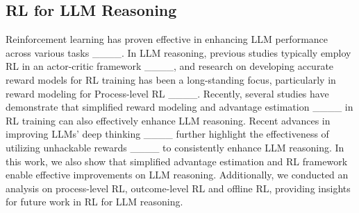 \subsection{RL for LLM Reasoning}
Reinforcement learning has proven effective in enhancing LLM performance across various tasks ____. In LLM reasoning, previous studies typically employ RL in an actor-critic framework ____, and research on developing accurate reward models for RL training has been a long-standing focus, particularly in reward modeling for Process-level RL ____. Recently, several studies have demonstrate that simplified reward modeling and advantage estimation ____ in RL training can also effectively enhance LLM reasoning. Recent advances in improving LLMs' deep thinking ____ further highlight the effectiveness of utilizing unhackable rewards ____ to consistently enhance LLM reasoning.
In this work, we also show that simplified advantage estimation and RL framework enable effective improvements on LLM reasoning. Additionally, we conducted an analysis on process-level RL, outcome-level RL and offline RL, providing insights for future work in RL for LLM reasoning.